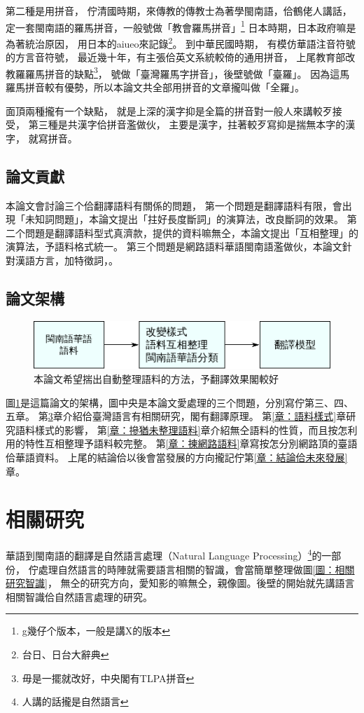 \documentclass[final,oneside,onecolumn,12pt,a4paper]{book}%
\begin{document}
第二種是用拼音，
佇清國時期，來傳教的傳教士為著學閩南語，佮鶴佬人講話，
定一套閩南語的羅馬拼音，一般號做「教會羅馬拼音」\footnote{g幾仔个版本，一般是講X的版本}
日本時期，日本政府嘛是為著統治原因，
用日本的aiueo來記錄\footnote{台日、日台大辭典}。
到中華民國時期，
有模仿華語注音符號的方言音符號，
最近幾十年，有主張佮英文系統較倚的通用拼音，
上尾教育部改教羅羅馬拼音的缺點\footnote{毋是一擺就改好，中央閣有TLPA拼音}，
號做「臺灣羅馬字拼音」，後壁號做「臺羅」。
因為這馬羅馬拼音較有優勢，所以本論文共全部用拼音的文章攏叫做「全羅」。

面頂兩種攏有一个缺點，
就是上深的漢字抑是全篇的拼音對一般人來講較歹接受，
第三種是共漢字佮拼音濫做伙，
主要是漢字，拄著較歹寫抑是揣無本字的漢字，
就寫拼音。

\section{論文貢獻}
\label{節：論文貢獻}
本論文會討論三个佮翻譯語料有關係的問題，
第一个問題是翻譯語料有限，會出現「未知詞問題」，本論文提出「拄好長度斷詞」的演算法，改良斷詞的效果。
第二个問題是翻譯語料型式真濟款，提供的資料嘛無仝，本論文提出「互相整理」的演算法，予語料格式統一。%
第三个問題是網路語料華語閩南語濫做伙，本論文針對漢語方言，加特徵詞，。

\section{論文架構}
\label{節：論文架構}

\begin{figure}
\centerline{\includegraphics[keepaspectratio]{圖/規个論文}}
\caption{本論文希望揣出自動整理語料的方法，予翻譯效果閣較好}
\label{圖：規个論文架構}
\end{figure}
圖\ref{圖：規个論文架構}是這篇論文的架構，圖中央是本論文愛處理的三个問題，分別寫佇第三、四、五章。
第\ref{章：相關研究}章介紹佮臺灣語言有相關研究，閣有翻譯原理。
第\ref{章：語料樣式}章研究語料樣式的影響，
第\ref{章：摻猶未整理語料}章介紹無仝語料的性質，而且按怎利用的特性互相整理予語料較完整。
第\ref{章：揀網路語料}章寫按怎分別網路頂的臺語佮華語資料。
上尾的結論佮以後會當發展的方向攏記佇第\ref{章：結論佮未來發展}章。

\chapter{相關研究}
\label{章：相關研究}
華語到閩南語的翻譯是自然語言處理（Natural Language Processing）\footnote{人講的話攏是自然語言}的一部份，
佇處理自然語言的時陣就需要語言相關的智識，會當簡單整理做圖\ref{圖：相關研究智識}，
無仝的研究方向，愛知影的嘛無仝，親像圖。後壁的開始就先講語言相關智識佮自然語言處理的研究。
\end{document}
